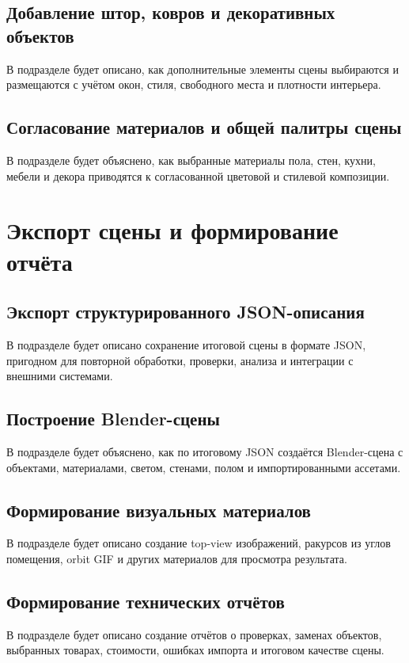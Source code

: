 \documentclass[times]{itmo-student-thesis}
\begin{document}
\subsection{Добавление штор, ковров и декоративных объектов}
В подразделе будет описано, как дополнительные элементы сцены выбираются и размещаются с учётом окон, стиля, свободного места и плотности интерьера.

\subsection{Согласование материалов и общей палитры сцены}
В подразделе будет объяснено, как выбранные материалы пола, стен, кухни, мебели и декора приводятся к согласованной цветовой и стилевой композиции.

\section{Экспорт сцены и формирование отчёта}

\subsection{Экспорт структурированного JSON-описания}
В подразделе будет описано сохранение итоговой сцены в формате JSON, пригодном для повторной обработки, проверки, анализа и интеграции с внешними системами.

\subsection{Построение Blender-сцены}
В подразделе будет объяснено, как по итоговому JSON создаётся Blender-сцена с объектами, материалами, светом, стенами, полом и импортированными ассетами.

\subsection{Формирование визуальных материалов}
В подразделе будет описано создание top-view изображений, ракурсов из углов помещения, orbit GIF и других материалов для просмотра результата.

\subsection{Формирование технических отчётов}
В подразделе будет описано создание отчётов о проверках, заменах объектов, выбранных товарах, стоимости, ошибках импорта и итоговом качестве сцены.
\end{document}
